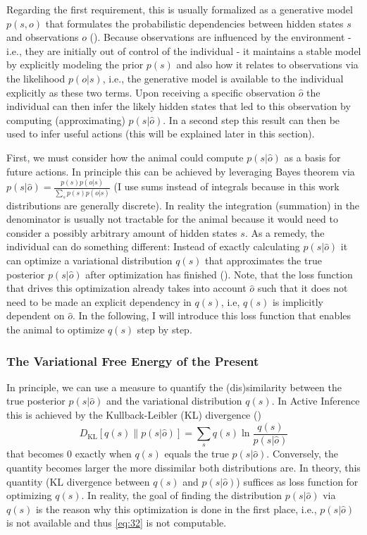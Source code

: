 Regarding the first requirement, this is usually formalized as a generative model \(p(s,o)\) that formulates the probabilistic dependencies between hidden states \(s\) and observations \(o\) (\cite{friston2010}). Because observations are influenced by the environment - i.e., they are initially out of control of the individual - it maintains a stable model by explicitly modeling the prior \(p(s)\) and also how it relates to observations via the likelihood \(p(o|s)\), i.e., the generative model is available to the individual explicitly as these two terms. Upon receiving a specific observation \(\hat o\) the individual can then infer the likely hidden states that led to this observation by computing (approximating) \(p(s|\hat o)\). In a second step this result can then be used to infer useful actions (this will be explained later in this section).

First, we must consider how the animal could compute \(p(s|\hat o)\) as a basis for future actions. In principle this can be achieved by leveraging Bayes theorem via \(p(s|\hat o) = \frac{p(s)p(o|s)}{\sum_s p(s)p(o|s)}\) (I use sums instead of integrals because in this work distributions are generally discrete). In reality the integration (summation) in the denominator is usually not tractable for the animal because it would need to consider a possibly arbitrary amount of hidden states \(s\). As a remedy, the individual can do something different: Instead of exactly calculating \(p(s|\hat o)\) it can optimize a variational distribution \(q(s)\) that approximates the true posterior \(p(s|\hat o)\) after optimization has finished (\cite{bishop2006}). Note, that the loss function that drives this optimization already takes into account \(\hat o\) such that it does not need to be made an explicit dependency in \(q(s)\), i.e, \(q(s)\) is implicitly dependent on \(\hat o\). In the following, I will introduce this loss function that enables the animal to optimize \(q(s)\) step by step.

\subsubsection{The Variational Free Energy of the Present}

In principle, we can use a measure to quantify the (dis)similarity between the true posterior \(p(s|\hat o)\) and the variational distribution \(q(s)\). In Active Inference this is achieved by the Kullback-Leibler (KL) divergence (\cite{friston2010})
\begin{equation}
    D_{\text{KL}}[q(s) \parallel p(s|\hat o)] = \sum_s q(s) \ln \frac{q(s)}{p(s|\hat o)}
    \label{eq:32}
\end{equation}
that becomes 0 exactly when \(q(s)\) equals the true \(p(s|\hat o)\). Conversely, the quantity becomes larger the more dissimilar both distributions are. In theory, this quantity (KL divergence between \(q(s)\) and \(p(s|\hat o)\)) suffices as loss function for optimizing \(q(s)\). In reality, the goal of finding the distribution \(p(s|\hat o)\) via \(q(s)\) is the reason why this optimization is done in the first place, i.e., \(p(s|\hat o)\) is not available and thus \cref{eq:32} is not computable.

